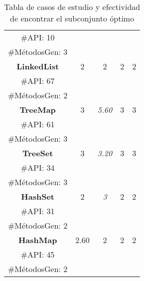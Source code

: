 \begin{table}[H]
\begin{tabular}{c ccccc}
\multicolumn{2}{c}{\tiny \#API: 10} &  &   & &    \\
\multicolumn{2}{c}{\tiny \#MétodosGen: 3} &  &   & &    \\
\midrule\multicolumn{2}{c}{\textbf{LinkedList}} & 2 &  2 &  2 &  2  \\
\multicolumn{2}{c}{\tiny \#API: 67} &  &   & &   \\
\multicolumn{2}{c}{\tiny \#MétodosGen: 2} &  &   & &    \\
\midrule
\multicolumn{2}{c}{\textbf{TreeMap}} &  3 & \cellcolor{gray!25}\emph{5.60}  &  3  &  3   \\
\multicolumn{2}{c}{\tiny \#API: 61} &  &   & &  \\
\multicolumn{2}{c}{\tiny \#MétodosGen: 3} &  &   & &  \\
\midrule
\multicolumn{2}{c}{\textbf{TreeSet}} &  3&\cellcolor{gray!25} \emph{3.20}  &  3 &  3  \\
\multicolumn{2}{c}{\tiny \#API: 34} &  &   & &  \\
\multicolumn{2}{c}{\tiny \#MétodosGen: 3} &  &   & &   \\
\midrule
\multicolumn{2}{c}{\textbf{HashSet}} &  2 &\cellcolor{gray!25} \emph{3}  &  2 &  2 \\
\multicolumn{2}{c}{\tiny \#API: 31} &  &   & &  \\
\multicolumn{2}{c}{\tiny \#MétodosGen: 2} &  &   & &    \\
\midrule
\multicolumn{2}{c}{\textbf{HashMap}} & \cellcolor{gray!25}2.60  & 2  &2   &2     \\
\multicolumn{2}{c}{\tiny \#API: 45} &  &   & &    \\
\multicolumn{2}{c}{\tiny \#MétodosGen: 2} &  &   & &   \\
\hline
\end{tabular}

\caption{Tabla de casos de estudio y efectividad de encontrar el subconjunto óptimo}
\label{tab:efectividad}
\end{table}

